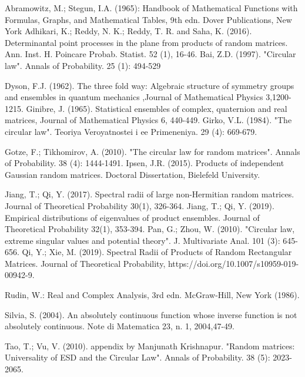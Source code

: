 \documentclass[12pt]{article}
\theoremstyle{plain}
\theoremstyle{definition}
\theoremstyle{remark}
\begin{document}
\begin{thebibliography}{n} %


  Abramowitz, M.; Stegun, I.A. (1965): Handbook of Mathematical Functions with Formulas, Graphs, and Mathematical Tables, 9th edn. Dover Publications, New York 
Adhikari, K.; Reddy, N. K.; Reddy, T. R. and Saha, K. (2016). Determinantal point processes in the plane from products of random matrices. Ann. Inst. H. Poincare Probab. Statist. 52 (1), 16-46.
Bai, Z.D. (1997). "Circular law". Annals of Probability. 25 (1): 494-529

Dyson, F.J. (1962). The three fold way: Algebraic structure of symmetry groups and ensembles in quantum mechanics ,Journal of Mathematical Physics 3,1200-1215.
 Ginibre, J. (1965). Statistical ensembles of complex, quaternion and real matrices, Journal of Mathematical Physics 6,  440-449.
 Girko, V.L. (1984). "The circular law". Teoriya Veroyatnostei i ee Primeneniya. 29 (4): 669-679.

Gotze, F.; Tikhomirov, A. (2010). "The circular law for random matrices". Annals of Probability. 38 (4): 1444-1491.
 Ipsen, J.R. (2015). Products of independent Gaussian random matrices. Doctoral Dissertation, Bielefeld University.

Jiang, T.; Qi, Y. (2017). Spectral radii of large non-Hermitian random matrices. Journal of Theoretical Probability 30(1), 326-364.
 Jiang, T.; Qi, Y. (2019). Empirical distributions of eigenvalues of product ensembles. Journal of Theoretical Probability 32(1), 353-394.
Pan, G.; Zhou, W. (2010). "Circular law, extreme singular values and potential theory". J. Multivariate Anal. 101 (3): 645-656.
 Qi, Y.; Xie, M. (2019). Spectral Radii of Products of Random Rectangular Matrices. Journal of Theoretical Probability, https://doi.org/10.1007/s10959-019-00942-9.

Rudin, W.: Real and Complex Analysis, 3rd edn. McGraw-Hill, New York (1986).


Silvia, S. (2004). An absolutely continuous function whose inverse function is not absolutely continuous. Note di Matematica 23, n. 1, 2004,47-49.

Tao, T.; Vu, V. (2010). appendix by Manjunath Krishnapur. "Random matrices: Universality of ESD and the Circular Law". Annals of Probability. 38 (5): 2023-2065.


\end{thebibliography}
\end{document}
